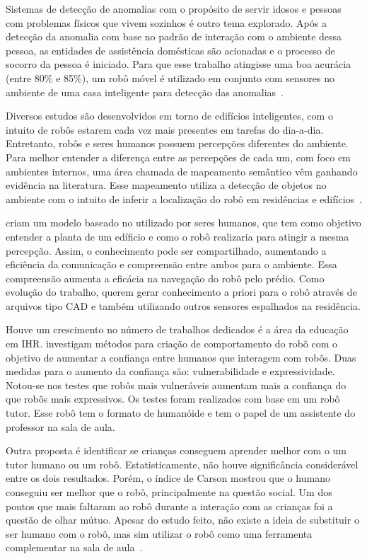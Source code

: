 Sistemas de detecção de anomalias com o propósito de servir idosos e pessoas com problemas físicos que vivem sozinhos é outro tema explorado. Após a detecção da anomalia com base no padrão de interação com o ambiente dessa pessoa, as entidades de assistência domésticas são acionadas e o processo de socorro da pessoa é iniciado. Para que esse trabalho atingisse uma boa acurácia (entre 80\% e 85\%), um robô móvel é utilizado em conjunto com sensores no ambiente de uma casa inteligente para detecção das anomalias~\cite{lundstrom:2015}.

Diversos estudos são desenvolvidos em torno de edifícios inteligentes, com o intuito de robôs estarem cada vez mais presentes em tarefas do dia-a-dia. Entretanto, robôs e seres humanos possuem percepções diferentes do ambiente. Para melhor entender a diferença entre as percepções de cada um, com foco em ambientes internos, uma área chamada de mapeamento semântico vêm ganhando evidência na literatura. Esse mapeamento utiliza a detecção de objetos no ambiente com o intuito de inferir a localização do robô em residências e edifícios~\cite{turek:2017}.

\textcite{turek:2017} criam um modelo baseado no utilizado por seres humanos, que tem como objetivo entender a planta de um edíficio e como o robô realizaria para atingir a mesma percepção. Assim, o conhecimento pode ser compartilhado, aumentando a eficiência da comunicação e compreensão entre ambos para o ambiente. Essa compreensão aumenta a eficácia na navegação do robô pelo prédio. Como evolução do trabalho, \textcite{turek:2017} querem gerar conhecimento a priori para o robô através de arquivos tipo CAD e também utilizando outros sensores espalhados na residência.

Houve um crescimento no número de trabalhos dedicados é a área da educação em IHR. \textcite{martelaro:2016} investigam métodos para criação de comportamento do robô com o objetivo de aumentar a confiança entre humanos que interagem com robôs. Duas medidas para o aumento da confiança são: vulnerabilidade e expressividade. Notou-se nos testes que robôs mais vulneráveis aumentam mais a confiança do que robôs mais expressivos. Os testes foram realizados com base em um robô tutor. Esse robô tem o formato de humanóide e tem o papel de um assistente do professor na sala de aula.

Outra proposta é identificar se crianças conseguem aprender melhor com o um tutor humano ou um robô. Estatisticamente, não houve significância considerável entre os dois resultados. Porém, o índice de Carson mostrou que o humano conseguiu ser melhor que o robô, principalmente na questão social. Um dos pontos que mais faltaram ao robô durante a interação com as crianças foi a questão de olhar mútuo. Apesar do estudo feito, não existe a ideia de substituir o ser humano com o robô, mas sim utilizar o robô como uma ferramenta complementar na sala de aula~\cite{kennedy:2016}.

